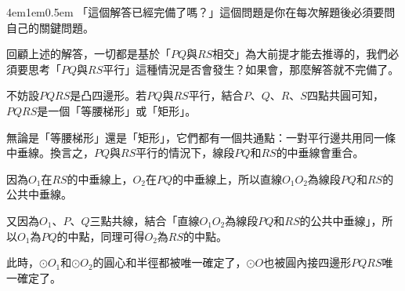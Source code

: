 \documentclass[12pt]{article}
\begin{document}
\begin{mybox}[反思]{4em}{1em}{0.5em}
    「這個解答已經完備了嗎？」這個問題是你在每次解題後必須要問自己的關鍵問題。

    回顧上述的解答，一切都是基於「$PQ$與$RS$相交」為大前提才能去推導的，我們必須要思考「$PQ$與$RS$平行」這種情況是否會發生？如果會，那麼解答就不完備了。

    不妨設$PQRS$是凸四邊形。若$PQ$與$RS$平行，結合$P$、$Q$、$R$、$S$四點共圓可知，$PQRS$是一個「等腰梯形」或「矩形」。

    無論是「等腰梯形」還是「矩形」，它們都有一個共通點：一對平行邊共用同一條中垂線。換言之，$PQ$與$RS$平行的情況下，線段$PQ$和$RS$的中垂線會重合。

    因為$O_1$在$RS$的中垂線上，$O_2$在$PQ$的中垂線上，所以直線$O_1O_2$為線段$PQ$和$RS$的公共中垂線。

    又因為$O_1$、$P$、$Q$三點共線，結合「直線$O_1O_2$為線段$PQ$和$RS$的公共中垂線」，所以$O_1$為$PQ$的中點，同理可得$O_2$為$RS$的中點。

    此時，$\odot{O_1}$和$\odot{O_2}$的圓心和半徑都被唯一確定了，$\odot{O}$也被圓內接四邊形$PQRS$唯一確定了。
\end{mybox}
\end{document}
